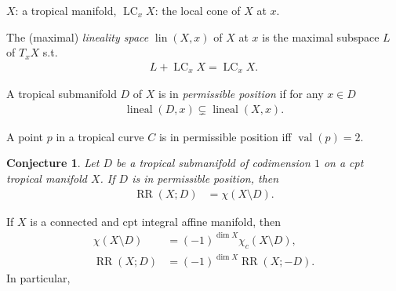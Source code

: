 \documentclass[dvipdfmx,12pt]{beamer}%
\newtheorem{conjecture}[theorem]{Conjecture}
\theoremstyle{definition}
\newcommand{\opn}[1]{\operatorname{#1}}
\begin{document}
\begin{frame}

$X$: a tropical manifold,
$\opn{LC}_x X$: the local cone of $X$ at $x$.

\begin{definition}

The (maximal) \emph{lineality space} 
$\opn{lin}(X,x)$ of $X$ at $x$ is
the maximal subspace $L$ of $T_x X$ s.t.
\begin{align}
L+\opn{LC}_x X =\opn{LC}_x X.
\end{align}

\end{definition}



\begin{definition}
A tropical submanifold $D$ of $X$ is in 
\emph{permissible position} if for any $x\in D$
\begin{align}
\opn{lineal}(D,x) \subsetneq
 \opn{lineal}(X,x).
\end{align}

\end{definition}




\end{frame}


\begin{frame}
\begin{example}
A point $p$ in a tropical curve $C$ is in permissible 
position iff $\opn{val}(p)=2$.
\end{example}
\end{frame}

\begin{frame}
\begin{conjecture}
\label{conjecture-rr-euler}
Let $D$ be a tropical submanifold of codimension $1$ on
a cpt tropical manifold $X$. 
If $D$ is in permissible position, then 
\begin{align}
\opn{RR}(X;D)&=\chi(X\setminus D).
\end{align}
\end{conjecture}

\begin{example}
If $X$ is a connected and cpt integral affine manifold,
then
\begin{align}
\chi (X\setminus D)&=(-1)^{\dim X}\chi_c(X\setminus D), \\
\opn{RR}(X;D)&=(-1)^{\dim X}\opn{RR}(X;-D).
\end{align}
In particular, 
\end{example}

\end{frame}

\begin{frame}
	
\end{frame}
\end{document}
